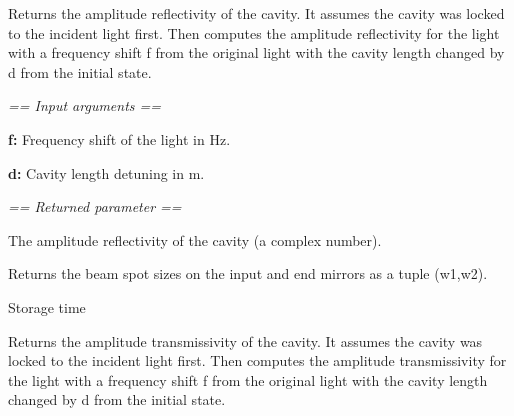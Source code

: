 \documentclass[letterpaper,10pt,english]{sphinxmanual}
\begin{document}
\begin{fulllineitems}
\begin{fulllineitems}
\end{fulllineitems}


\begin{fulllineitems}
\label{api/gtrace.optics:gtrace.optics.cavity.Cavity.refl}
Returns the amplitude reflectivity of the cavity.
It assumes the cavity was locked to the incident light first. Then computes the
amplitude reflectivity for the light with a frequency shift f from the original light
with the cavity length changed by d from the initial state.

\emph{== Input arguments ==}

\textbf{f:} Frequency shift of the light in Hz.

\textbf{d:} Cavity length detuning in m.

\emph{== Returned parameter ==}

The amplitude reflectivity of the cavity (a complex number).

\end{fulllineitems}


\begin{fulllineitems}
\label{api/gtrace.optics:gtrace.optics.cavity.Cavity.spotSize}
Returns the beam spot sizes on the input and end mirrors
as a tuple (w1,w2).

\end{fulllineitems}


\begin{fulllineitems}
\label{api/gtrace.optics:gtrace.optics.cavity.Cavity.storageTime}
Storage time

\end{fulllineitems}


\begin{fulllineitems}
\label{api/gtrace.optics:gtrace.optics.cavity.Cavity.trans}
Returns the amplitude transmissivity of the cavity.
It assumes the cavity was locked to the incident light first. Then computes the
amplitude transmissivity for the light with a frequency shift f from the original light
with the cavity length changed by d from the initial state.


\end{fulllineitems}
\end{fulllineitems}
\end{document}
